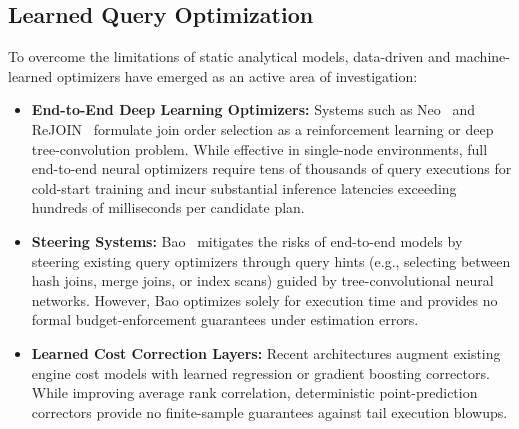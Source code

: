 \subsection{Learned Query Optimization}
To overcome the limitations of static analytical models, data-driven and machine-learned optimizers have emerged as an active area of investigation:
\begin{itemize}
    \item \textbf{End-to-End Deep Learning Optimizers:} Systems such as Neo~\cite{marcus2019neo} and ReJOIN~\cite{marcus2018rejoin} formulate join order selection as a reinforcement learning or deep tree-convolution problem. While effective in single-node environments, full end-to-end neural optimizers require tens of thousands of query executions for cold-start training and incur substantial inference latencies exceeding hundreds of milliseconds per candidate plan.
    \item \textbf{Steering Systems:} Bao~\cite{marcus2021bao} mitigates the risks of end-to-end models by steering existing query optimizers through query hints (e.g., selecting between hash joins, merge joins, or index scans) guided by tree-convolutional neural networks. However, Bao optimizes solely for execution time and provides no formal budget-enforcement guarantees under estimation errors.
    \item \textbf{Learned Cost Correction Layers:} Recent architectures augment existing engine cost models with learned regression or gradient boosting correctors. While improving average rank correlation, deterministic point-prediction correctors provide no finite-sample guarantees against tail execution blowups.
\end{itemize}

